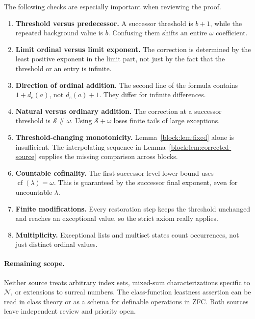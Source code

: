 \documentclass[11pt,a4paper]{article}
\theoremstyle{definition}
\newcommand{\cf}{\operatorname{cf}}
\newcommand{\ns}{\mathbin{\#}}
\newcommand{\OpN}{\mathcal N}
\newcommand{\OpS}{\mathcal S}
\begin{document}
The following checks are especially important when reviewing the proof.
\begin{enumerate}[leftmargin=*,itemsep=5pt]
\item \textbf{Threshold versus predecessor.} A successor threshold is $b+1$, while the repeated background value is $b$. Confusing them shifts an entire $\omega$ coefficient.
\item \textbf{Limit ordinal versus limit exponent.} The correction is determined by the least positive exponent in the limit part, not just by the fact that the threshold or an entry is infinite.
\item \textbf{Direction of ordinal addition.} The second line of the formula contains $1+d_e(a)$, not $d_e(a)+1$. They differ for infinite differences.
\item \textbf{Natural versus ordinary addition.} The correction at a successor threshold is $\OpS\ns\omega$. Using $\OpS+\omega$ loses finite tails of large exceptions.
\item \textbf{Threshold-changing monotonicity.} Lemma~\ref{block:lem:fixed} alone is insufficient. The interpolating sequence in Lemma~\ref{block:lem:corrected-source} supplies the missing comparison across blocks.
\item \textbf{Countable cofinality.} The first successor-level lower bound uses $\cf(\lambda)=\omega$. This is guaranteed by the successor final exponent, even for uncountable $\lambda$.
\item \textbf{Finite modifications.} Every restoration step keeps the threshold unchanged and reaches an exceptional value, so the strict axiom really applies.
\item \textbf{Multiplicity.} Exceptional lists and multiset states count occurrences, not just distinct ordinal values.
\end{enumerate}


\paragraph{Remaining scope.}
Neither source treats arbitrary index sets, mixed-sum characterizations
specific to $\OpN$, or extensions to surreal numbers. The class-function
leastness assertion can be read in class theory or as a schema for definable
operations in ZFC. Both sources leave independent review and priority open.

\appendix
\end{document}
